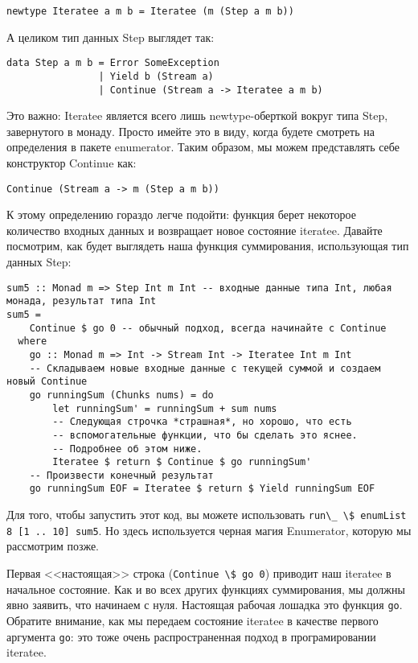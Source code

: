 \begin{lstlisting}
newtype Iteratee a m b = Iteratee (m (Step a m b))
\end{lstlisting}

А целиком тип данных Step выглядет так:

\begin{lstlisting}
data Step a m b = Error SomeException 
                | Yield b (Stream a) 
                | Continue (Stream a -> Iteratee a m b)
\end{lstlisting}

Это важно: Iteratee является всего лишь newtype-оберткой вокруг типа Step, завернутого в монаду. Просто имейте это в виду, когда будете смотреть на определения в пакете enumerator. Таким образом, мы можем представлять себе конструктор Continue как:

\begin{lstlisting}
Continue (Stream a -> m (Step a m b))
\end{lstlisting}

К этому определению гораздо легче подойти: функция берет некоторое количество входных данных и возвращает новое состояние iteratee. Давайте посмотрим, как будет выглядеть наша функция суммирования, использующая тип данных Step:

\begin{lstlisting}
sum5 :: Monad m => Step Int m Int -- входные данные типа Int, любая монада, результат типа Int
sum5 =
    Continue $ go 0 -- обычный подход, всегда начинайте с Continue
  where
    go :: Monad m => Int -> Stream Int -> Iteratee Int m Int
    -- Складываем новые входные данные с текущей суммой и создаем новый Continue
    go runningSum (Chunks nums) = do
        let runningSum' = runningSum + sum nums
        -- Следующая строчка *страшная*, но хорошо, что есть 
        -- вспомогательные функции, что бы сделать это яснее.
        -- Подробнее об этом ниже.
        Iteratee $ return $ Continue $ go runningSum'
    -- Произвести конечный результат
    go runningSum EOF = Iteratee $ return $ Yield runningSum EOF
\end{lstlisting}%

\begin{remark}
Для того, чтобы запустить этот код, вы можете использовать \lstinline'run\_ \$ enumList 8 [1 .. 10] sum5'. Но здесь используется черная магия Enumerator, которую мы рассмотрим позже.
\end{remark}

Первая <<настоящая>> строка (\lstinline'Continue \$ go 0') приводит наш iteratee в начальное состояние. Как и во всех других функциях суммирования, мы должны явно заявить, что начинаем с нуля. Настоящая рабочая лошадка это функция \lstinline'go'. Обратите внимание, как мы передаем состояние iteratee в качестве первого аргумента \lstinline'go': это тоже очень распространенная подход в програмировании iteratee.

